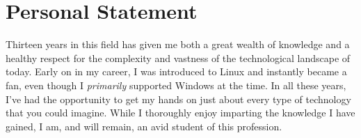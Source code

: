 \documentclass[]{twentysecondcv}
\begin{document}
\section{Personal Statement}
Thirteen years in this field has given me both a great wealth of knowledge
and a healthy respect for the complexity and vastness of the technological
landscape of today. Early on in my career, I was introduced to Linux and instantly became a fan, even
though I \emph{primarily} supported Windows at the time. In all these years, I've had
the opportunity to get my hands on just about every type of technology that you could
imagine. While I thoroughly enjoy imparting the knowledge I have gained, I am, and
will remain, an avid student of this profession.

\end{document}

